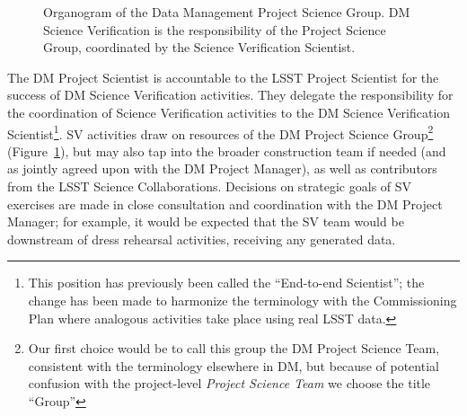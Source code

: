 \begin{figure}
\centering
{}
\caption{Organogram of the Data Management Project Science Group. DM Science
Verification is the responsibility of the Project Science Group, coordinated
by the Science Verification Scientist.\label{fig:DMpsg}}
\end{figure}

The DM Project Scientist is accountable to the LSST Project Scientist for
the success of DM Science Verification activities.  They delegate the
responsibility for the coordination of Science Verification activities to
the DM Science Verification Scientist\footnote{This position has previously
been called the ``End-to-end Scientist''; the change has been made to
harmonize the terminology with the Commissioning Plan where analogous
activities take place using real LSST data.}.  SV activities draw on
resources of the DM Project Science Group\footnote{Our first choice would be
to call this group the {\rm DM Project Science Team}, consistent with the
terminology elsewhere in DM, but because of potential confusion with the
project-level {\em Project Science Team} we choose the title ``Group''}
(Figure~\ref{fig:DMpsg}), but may also tap into the broader construction
team if needed (and as jointly agreed upon with the DM Project Manager), as well
as contributors from the LSST Science Collaborations.  Decisions on
strategic goals of SV exercises are made in close consultation and
coordination with the DM Project Manager; for example, it would be expected
that the SV team would be downstream of dress rehearsal activities,
receiving any generated data.

